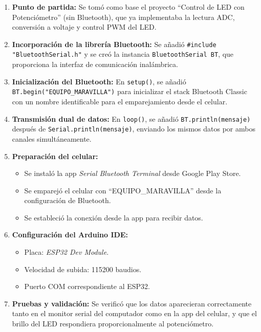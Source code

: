 \documentclass[12pt,a4paper]{article}
\begin{document}
\begin{enumerate}
    \item \textbf{Punto de partida:} Se tomó como base el proyecto ``Control de LED con Potenciómetro'' (sin Bluetooth), que ya implementaba la lectura ADC, conversión a voltaje y control PWM del LED.
    
    \item \textbf{Incorporación de la librería Bluetooth:} Se añadió \texttt{\#include "BluetoothSerial.h"} y se creó la instancia \texttt{BluetoothSerial BT}, que proporciona la interfaz de comunicación inalámbrica.
    
    \item \textbf{Inicialización del Bluetooth:} En \texttt{setup()}, se añadió \texttt{BT.begin("EQUIPO\_MARAVILLA")} para inicializar el stack Bluetooth Classic con un nombre identificable para el emparejamiento desde el celular.
    
    \item \textbf{Transmisión dual de datos:} En \texttt{loop()}, se añadió \texttt{BT.println(mensaje)} después de \texttt{Serial.println(mensaje)}, enviando los mismos datos por ambos canales simultáneamente.
    
    \item \textbf{Preparación del celular:}
    \begin{itemize}
        \item Se instaló la app \textit{Serial Bluetooth Terminal} desde Google Play Store.
        \item Se emparejó el celular con ``EQUIPO\_MARAVILLA'' desde la configuración de Bluetooth.
        \item Se estableció la conexión desde la app para recibir datos.
    \end{itemize}
    
    \item \textbf{Configuración del Arduino IDE:}
    \begin{itemize}
        \item Placa: \textit{ESP32 Dev Module}.
        \item Velocidad de subida: 115200 baudios.
        \item Puerto COM correspondiente al ESP32.
    \end{itemize}
    
    \item \textbf{Pruebas y validación:} Se verificó que los datos aparecieran correctamente tanto en el monitor serial del computador como en la app del celular, y que el brillo del LED respondiera proporcionalmente al potenciómetro.
\end{enumerate}
\end{document}
